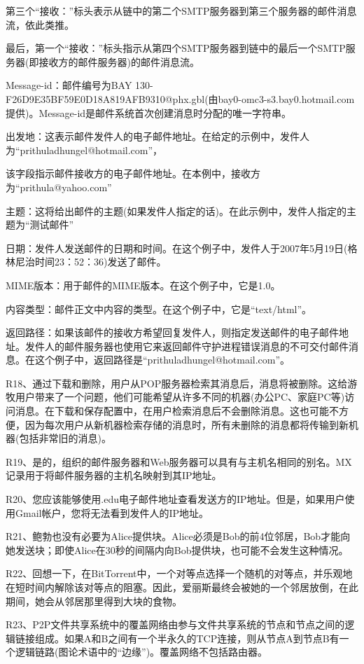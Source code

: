 \documentclass[11pt,UTF8,twoside]{article}
\begin{document}
	第三个“接收：”标头表示从链中的第二个SMTP服务器到第三个服务器的邮件消息流，依此类推。
	
	最后，第一个“接收：”标头指示从第四个SMTP服务器到链中的最后一个SMTP服务器(即接收方的邮件服务器)的邮件消息流。
	
	Message-id：邮件编号为BAY 130-F26D9E35BF59E0D18A819AFB9310@phx.gbl(由bay0-omc3-s3.bay0.hotmail.com提供)。Message-id是邮件系统首次创建消息时分配的唯一字符串。
	
	出发地：这表示邮件发件人的电子邮件地址。在给定的示例中，发件人为“prithuladhungel@hotmail.com”，
	
	该字段指示邮件接收方的电子邮件地址。在本例中，接收方为“prithula@yahoo.com”
	
	主题：这将给出邮件的主题(如果发件人指定的话)。在此示例中，发件人指定的主题为“测试邮件”
	
	日期：发件人发送邮件的日期和时间。在这个例子中，发件人于2007年5月19日(格林尼治时间23：52：36)发送了邮件。
	
	MIME版本：用于邮件的MIME版本。在这个例子中，它是1.0。
	
	内容类型：邮件正文中内容的类型。在这个例子中，它是“text/html”。
	
	返回路径：如果该邮件的接收方希望回复发件人，则指定发送邮件的电子邮件地址。发件人的邮件服务器也使用它来返回邮件守护进程错误消息的不可交付邮件消息。在这个例子中，返回路径是“prithuladhungel@hotmail.com”。
	
	R18、通过下载和删除，用户从POP服务器检索其消息后，消息将被删除。这给游牧用户带来了一个问题，他们可能希望从许多不同的机器(办公PC、家庭PC等)访问消息。在下载和保存配置中，在用户检索消息后不会删除消息。这也可能不方便，因为每次用户从新机器检索存储的消息时，所有未删除的消息都将传输到新机器(包括非常旧的消息)。
	
	R19、是的，组织的邮件服务器和Web服务器可以具有与主机名相同的别名。MX记录用于将邮件服务器的主机名映射到其IP地址。
	
	R20、您应该能够使用.edu电子邮件地址查看发送方的IP地址。但是，如果用户使用Gmail帐户，您将无法看到发件人的IP地址。
	
	R21、鲍勃也没有必要为Alice提供块。Alice必须是Bob的前4位邻居，Bob才能向她发送块；即使Alice在30秒的间隔内向Bob提供块，也可能不会发生这种情况。
	
	R22、回想一下，在BitTorrent中，一个对等点选择一个随机的对等点，并乐观地在短时间内解除该对等点的阻塞。因此，爱丽斯最终会被她的一个邻居放倒，在此期间，她会从邻居那里得到大块的食物。
	
	R23、P2P文件共享系统中的覆盖网络由参与文件共享系统的节点和节点之间的逻辑链接组成。如果A和B之间有一个半永久的TCP连接，则从节点A到节点B有一个逻辑链路(图论术语中的“边缘”)。覆盖网络不包括路由器。
	
\end{document}
